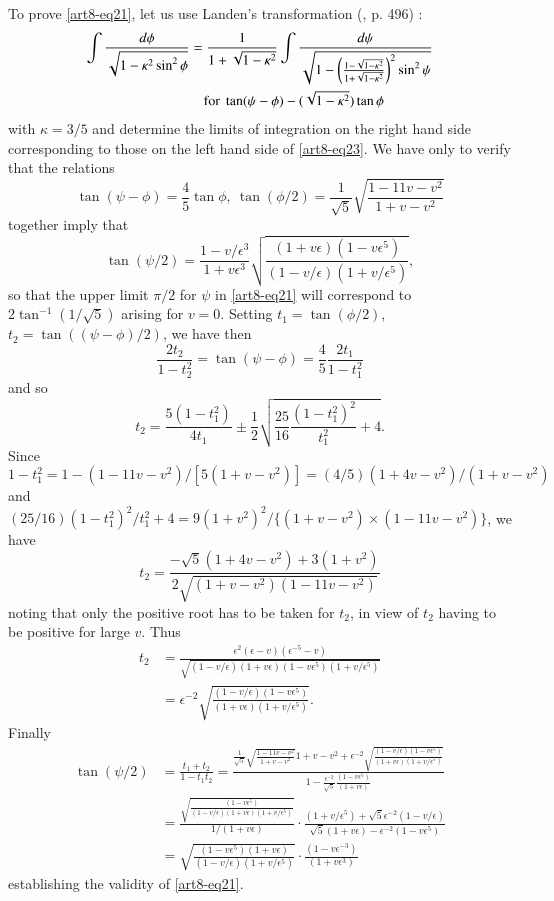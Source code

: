 To prove \eqref{art8-eq21}, let us use Landen's transformation (\cite{art8-key12}, p. 496) :
\begin{align}
\int \frac{d\phi}{\sqrt{1-\kappa^{2}\sin^{2}\phi}} &=\dfrac{1}{1+\sqrt{1-\kappa^{2}}}\int
\frac{d\psi}{\sqrt{1-\left(\frac{1-\sqrt{1-\kappa^{2}}}{1+\sqrt{1-\kappa^{2}}}\right)^{2}\sin^{2}\psi}}\notag\\
&\quad \text{for } \tan (\psi-\phi)-(\sqrt{1-\kappa^{2}})\tan\phi\label{art8-eq23}
\end{align}
with $\kappa=3/5$ and determine the limits of integration on the right hand side corresponding to those on the left hand side of \eqref{art8-eq23}. We have only to verify that the relations 
$$
\tan(\psi-\phi)=\frac{4}{5}\tan\phi, \ 
\tan(\phi/2)=\dfrac{1}{\sqrt{5}}\sqrt{\frac{1-11v-v^{2}}{1+v-v^{2}}}
$$
together imply that 
$$
\tan (\psi/2)=\dfrac{1-v/\epsilon^{3}}{1+v\epsilon^{3}}\sqrt{\frac{(1+v\epsilon)(1-v\epsilon^{5})}{(1-v/\epsilon)(1+v/\epsilon^{5})}},
$$
so that the upper limit $\pi/2$ for $\psi$ in \eqref{art8-eq21} will correspond to $2\tan^{-1}(1/\sqrt{5})$ arising for $v=0$. Setting $t_{1}=\tan(\phi/2)$, $t_{2}=\tan((\psi-\phi)/2)$, we have then
$$
\frac{2t_{2}}{1-t^{2}_{2}}=\tan (\psi-\phi)=\frac{4}{5}\frac{2t_{1}}{1-t^{2}_{1}}
$$\pageoriginale
and so
$$
t_{2}=\frac{5(1-t^{2}_{1})}{4t_{1}}\pm \frac{1}{2}\sqrt{\frac{25}{16}\frac{(1-t^{2}_{1})^{2}}{t^{2}_{1}}+4}.
$$
Since $1-t^{2}_{1}=1-(1-11v-v^{2})/[5(1+v-v^{2})]=(4/5)(1+4v-v^{2})/(1+v-v^{2})$ and $(25/16)(1-t^{2}_{1})^{2}/t^{2}_{1}+4=9(1+v^{2})^{2}/\{(1+v-v^{2})\times (1-11v-v^{2})\}$, we have
$$
t_{2}=\frac{-\sqrt{5}(1+4v-v^{2})+3(1+v^{2})}{2\sqrt{(1+v-v^{2})(1-11v-v^{2})}}
$$
noting that only the positive root has to be taken for $t_{2}$, in view of $t_{2}$ having to be positive for large $v$. Thus
\begin{align*}
t_{2} &= \frac{\epsilon^{2}(\epsilon-v)(\epsilon^{-5}-v)}{\sqrt{(1-v/\epsilon)(1+v\epsilon)(1-v\epsilon^{5})(1+v/\epsilon^{5})}}\\
     &= \epsilon^{-2}\sqrt{\frac{(1-v/\epsilon)(1-v\epsilon^{5})}{(1+v\epsilon)(1+v/\epsilon^{5})}}.
\end{align*}
Finally
\begin{align*}
\tan(\psi/2) &= \frac{t_{1}+t_{2}}{1-t_{1}t_{2}}=\frac{\frac{1}{\sqrt{5}}\sqrt{\frac{1-11v-v^{2}}{1+v-v^{2}}}{1+v-v^{2}}+\epsilon^{-2}\sqrt{\frac{(1-v/\epsilon)(1-v\epsilon^{5})}{(1+v\epsilon)(1+v/\epsilon^{5})}}}{1-\frac{\epsilon^{-2}}{\sqrt{5}}\frac{(1-v\epsilon^{5})}{(1+v\epsilon)}}\\
&= \frac{\sqrt{\frac{(1-v\epsilon^{5})}{(1-v/\epsilon)(1+v\epsilon)(1+v/\epsilon^{5})}}}{1/(1+v\epsilon)}\cdot \frac{(1+v/\epsilon^{5})+\sqrt{5}\epsilon^{-2}(1-v/\epsilon)}{\sqrt{5}(1+v\epsilon)-\epsilon^{-2}(1-v\epsilon^{5})}\\
&= \sqrt{\frac{(1-v\epsilon^{5})(1+v\epsilon)}{(1-v/\epsilon)(1+v/\epsilon^{5})}}\cdot \frac{(1-v\epsilon^{-3})}{(1+v\epsilon^{3})}
\end{align*}
establishing the validity of \eqref{art8-eq21}.

